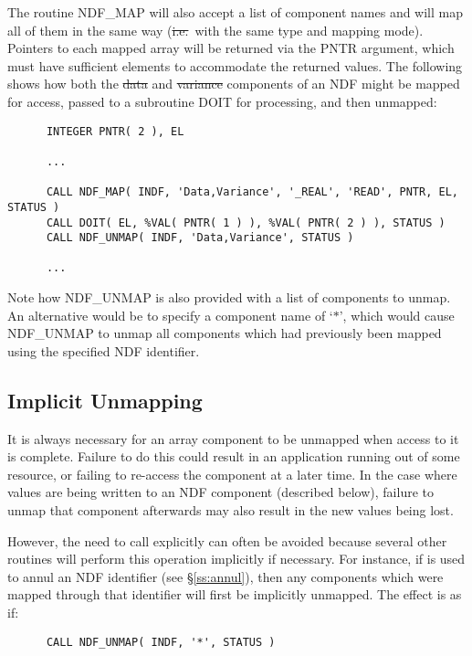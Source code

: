 The routine NDF\_MAP will also accept a list of component names and will map
all of them in the same way (\st{i.e.}\ with the same type and mapping mode). 
Pointers to each mapped array will be returned via the PNTR argument, which
must have sufficient elements to accommodate the returned values. 
The following shows how both the \st{data\/} and \st{variance\/} components of an
NDF  might be mapped for access, passed to a subroutine DOIT for processing, and
then unmapped: 

\small
\begin{verbatim}
      INTEGER PNTR( 2 ), EL

      ...

      CALL NDF_MAP( INDF, 'Data,Variance', '_REAL', 'READ', PNTR, EL, STATUS )
      CALL DOIT( EL, %VAL( PNTR( 1 ) ), %VAL( PNTR( 2 ) ), STATUS )
      CALL NDF_UNMAP( INDF, 'Data,Variance', STATUS )

      ...
\end{verbatim}
\normalsize

Note how NDF\_UNMAP is also provided with a list of components to unmap. 
An alternative would be to specify a component name of `$*$', which would
cause NDF\_UNMAP to unmap all components which had previously been mapped
using the specified NDF identifier. 

\subsection{\label{ss:implicitunmapping}Implicit Unmapping}

It is always necessary for an array component to be unmapped when access to
it is complete.
Failure to do this could result in an application running out of some resource,
or failing to re-access the component at a later time. 
In the case where values are being written to an NDF component (described
below), failure to unmap that component afterwards may also result in the
new values being lost. 

However, the need to call  explicitly can often be avoided because
several other routines will perform this operation implicitly if necessary. 
For instance, if  is used to annul an NDF identifier (see
\S\ref{ss:annul}), then any components which were mapped through that
identifier will first be implicitly unmapped. 
The effect is as if:

\small
\begin{verbatim}
      CALL NDF_UNMAP( INDF, '*', STATUS )
\end{verbatim}
\normalsize

